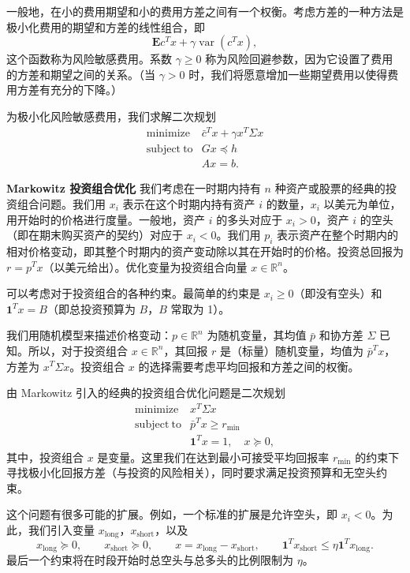 \documentclass[UTF8, 12pt, fontset=fandol, oneside]{ctexart}
\begin{document}
一般地，在小的费用期望和小的费用方差之间有一个权衡。考虑方差的一种方法是极小化费用的期望和方差的线性组合，即
\[
\mathbf{E}c^Tx+\gamma\operatorname{var}(c^Tx),
\]
这个函数称为风险敏感费用。系数 $\gamma\geq 0$ 称为风险回避参数，因为它设置了费用的方差和期望之间的关系。（当 $\gamma>0$ 时，我们将愿意增加一些期望费用以使得费用方差有充分的下降。）

为极小化风险敏感费用，我们求解二次规划
\[
\begin{array}{ll}
\mathop{\mathrm{minimize}} & \bar c^Tx+\gamma x^T\Sigma x\\
\mathrm{subject\ to} & Gx\preceq h\\
& Ax=b.
\end{array}
\]

\noindent\textbf{Markowitz 投资组合优化}\quad
我们考虑在一时期内持有 $n$ 种资产或股票的经典的投资组合问题。我们用 $x_i$ 表示在这个时期内持有资产 $i$ 的数量，$x_i$ 以美元为单位，用开始时的价格进行度量。一般地，资产 $i$ 的多头对应于 $x_i>0$，资产 $i$ 的空头（即在期末购买资产的契约）对应于 $x_i<0$。我们用 $p_i$ 表示资产在整个时期内的相对价格变动，即其整个时期内的资产变动除以其在开始时的价格。投资总回报为 $r=p^Tx$（以美元给出）。优化变量为投资组合向量 $x\in\mathbb{R}^n$。

可以考虑对于投资组合的各种约束。最简单的约束是 $x_i\geq 0$（即没有空头）和 $\mathbf{1}^Tx=B$（即总投资预算为 $B$，$B$ 常取为 1）。

我们用随机模型来描述价格变动：$p\in\mathbb{R}^n$ 为随机变量，其均值 $\bar p$ 和协方差 $\Sigma$ 已知。所以，对于投资组合 $x\in\mathbb{R}^n$，其回报 $r$ 是（标量）随机变量，均值为 $\bar p^Tx$，方差为 $x^T\Sigma x$。投资组合 $x$ 的选择需要考虑平均回报和方差之间的权衡。

由 Markowitz 引入的经典的投资组合优化问题是二次规划
\[
\begin{array}{ll}
\mathop{\mathrm{minimize}} & x^T\Sigma x\\
\mathrm{subject\ to} & \bar p^Tx\geq r_{\min}\\
& \mathbf{1}^Tx=1,\quad x\succeq 0,
\end{array}
\]
其中，投资组合 $x$ 是变量。这里我们在达到最小可接受平均回报率 $r_{\min}$ 的约束下寻找极小化回报方差（与投资的风险相关），同时要求满足投资预算和无空头约束。

这个问题有很多可能的扩展。例如，一个标准的扩展是允许空头，即 $x_i<0$。为此，我们引入变量 $x_{\mathrm{long}}$，$x_{\mathrm{short}}$，以及
\[
x_{\mathrm{long}}\succeq 0,\qquad
x_{\mathrm{short}}\succeq 0,\qquad
x=x_{\mathrm{long}}-x_{\mathrm{short}},\qquad
\mathbf{1}^Tx_{\mathrm{short}}\leq \eta\mathbf{1}^Tx_{\mathrm{long}}.
\]
最后一个约束将在时段开始时总空头与总多头的比例限制为 $\eta$。
\end{document}
